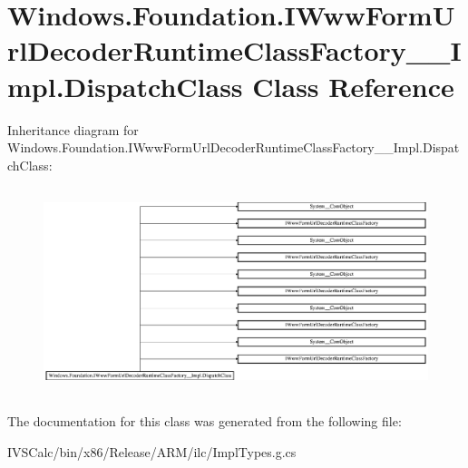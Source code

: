 \hypertarget{class_windows_1_1_foundation_1_1_i_www_form_url_decoder_runtime_class_factory_____impl_1_1_dispatch_class}{}\section{Windows.\+Foundation.\+I\+Www\+Form\+Url\+Decoder\+Runtime\+Class\+Factory\+\_\+\+\_\+\+Impl.\+Dispatch\+Class Class Reference}
\label{class_windows_1_1_foundation_1_1_i_www_form_url_decoder_runtime_class_factory_____impl_1_1_dispatch_class}
Inheritance diagram for Windows.\+Foundation.\+I\+Www\+Form\+Url\+Decoder\+Runtime\+Class\+Factory\+\_\+\+\_\+\+Impl.\+Dispatch\+Class\+:\begin{figure}[H]
\begin{center}
\leavevmode
\includegraphics[height=6.086957cm]{class_windows_1_1_foundation_1_1_i_www_form_url_decoder_runtime_class_factory_____impl_1_1_dispatch_class}
\end{center}
\end{figure}


The documentation for this class was generated from the following file\+:\begin{DoxyCompactItemize}
\item 
I\+V\+S\+Calc/bin/x86/\+Release/\+A\+R\+M/ilc/Impl\+Types.\+g.\+cs\end{DoxyCompactItemize}
